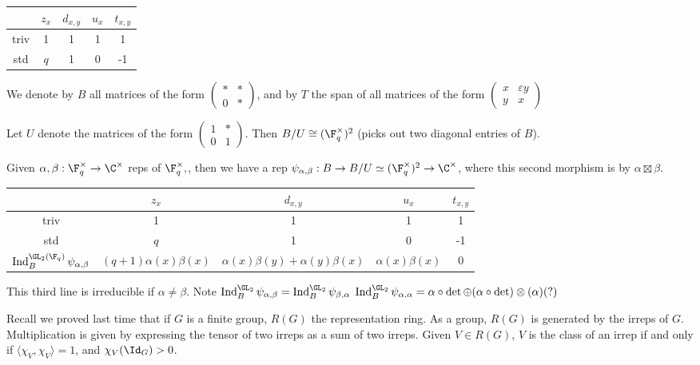 \documentclass[x11names,reqno,14pt]{extarticle}
\newcommand{\pmat}[4]{\begin{pmatrix} #1 & #2 \\ #3 & #4 \end{pmatrix}}
\DeclareMathOperator{\Ind}{Ind}
\begin{document}
\begin{center}
\begin{tabular}{c| c c c c}
\, &$z_x$ & $d_{x, y}$ & $u_x$ & $t_{x,y}$ \\
\hline
triv & 1 & 1 & 1 & 1 \\
std & $q$ & 1 & 0 & -1 \\
\end{tabular}
\end{center}

We denote by $B$ all matrices of the form $\pmat{*}{*}{0}{*}$, and by $T$ the span of all matrices of the form $\pmat{x}{\varepsilon y}{y}{x}$

Let $U$ denote the matrices of the form $\pmat{1}{*}{0}{1}$. Then $B/U \cong (\F_q^\times)^2$ (picks out two diagonal entries of $B$). 

Given $\alpha,\beta:\F_q^\times\to\C^\times$ reps of $\F_q^\times,$, then we have a rep $\psi_{\alpha,\beta}:B\to B/U \simeq(\F_q^\times)^2 \to \C^\times$, where this second morphism is by $\alpha\boxtimes\beta$. \begin{center}
\begin{tabular}{c| c c c c}
\, &$z_x$ & $d_{x, y}$ & $u_x$ & $t_{x,y}$ \\
\hline
triv & 1 & 1 & 1 & 1 \\
std & $q$ & 1 & 0 & -1 \\
$\Ind_B^{\GL_2(\F_q)}\psi_{\alpha,\beta}$ & $(q+1)\alpha(x)\beta(x)$ & $\alpha(x)\beta(y) + \alpha(y)\beta(x)$ & $\alpha(x)\beta(x)$ & 0 \\
\end{tabular}
\end{center}
This third line is irreducible if $\alpha \neq \beta$. Note $\Ind_B^{\GL_2}\psi_{\alpha,\beta} = \Ind_B^{\GL_2}\psi_{\beta,\alpha}$
$\Ind_B^{\GL_2}\psi_{\alpha,\alpha} = \alpha\circ\det\oplus(\alpha\circ\det)\otimes(\alpha) (?)$

Recall we proved last time that if $G$ is a finite group, $R(G)$ the representation ring. As a group, $R(G)$ is generated by the irreps of $G$. Multiplication is given by expressing the tensor of two irreps as a sum of two irreps. Given $V \in R(G)$, $V$ is the class of an irrep if and only if $\langle \chi_V, \chi_V \rangle =1$, and $\chi_V(\Id_G) > 0$. 
\end{document}

